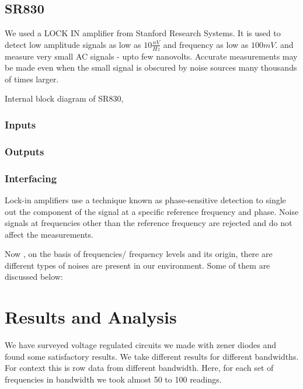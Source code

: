 \documentclass[draft,12pt]{article}
\begin{document}
\subsection{SR830}

We used a LOCK IN amplifier from Stanford Research Systems. It is used to detect low amplitude signals as low as $10\frac{nV}{Hz}$ and frequency as low as $100mV$.  and measure very small AC signals - upto few nanovolts. Accurate measurements may be made even when the small signal is obscured by noise sources many thousands of times larger.


Internal block diagram of SR830,

\begin{figure}[hbt!]
\end{figure}

\subsubsection{Inputs}

\subsubsection{Outputs}

\subsubsection{Interfacing}



Lock-in amplifiers use a technique known as
phase-sensitive detection to single out the component of the signal at a specific reference frequency and phase. Noise signals at frequencies other than the reference frequency are rejected and do not affect the measurements.


Now , on the basis of frequencies/ frequency levels and its origin, there are different types of noises are present in our environment. Some of them are discussed below:



\clearpage
\section{Results and Analysis}

We have surveyed voltage regulated circuits we made with zener diodes and found some satisfactory results. We take different results for different bandwidths. For context this is row data from different bandwidth. Here, for each set of frequencies in bandwidth we took almost 50 to 100 readings.
\end{document}
